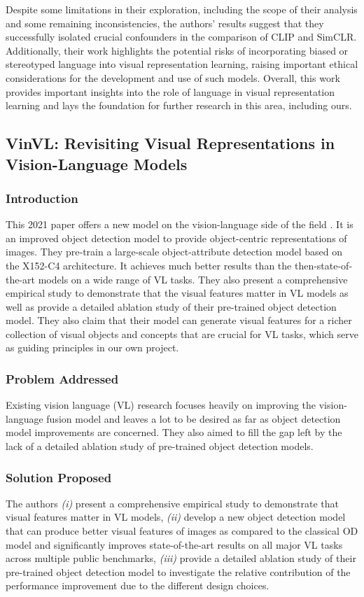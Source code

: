 \documentclass[11pt]{article}
\begin{document}
Despite some limitations in their exploration, including the scope of their analysis and some remaining inconsistencies, the authors' results suggest that they successfully isolated crucial confounders in the comparison of CLIP and SimCLR. Additionally, their work highlights the potential risks of incorporating biased or stereotyped language into visual representation learning, raising important ethical considerations for the development and use of such models. Overall, this work provides important insights into the role of language in visual representation learning and lays the foundation for further research in this area, including ours.

\subsection{VinVL: Revisiting Visual Representations in Vision-Language Models}

\subsubsection{Introduction}
This 2021 paper offers a new model on the vision-language side of the field \citep{zhang2021vinvl}. It is an improved object detection model to provide object-centric representations of images. They pre-train a large-scale object-attribute detection model based on the X152-C4 architecture. It achieves much better results than the then-state-of-the-art models on a wide range of VL tasks. They also present a comprehensive empirical study to demonstrate that the visual features matter in VL models as well as provide a detailed ablation study of their pre-trained object detection model. They also claim that their model can generate visual features for a richer collection of visual objects and concepts that are crucial for VL tasks, which serve as guiding principles in our own project.

\subsubsection{Problem Addressed}
Existing vision language (VL) research focuses heavily on improving the vision-language fusion model and leaves a lot to be desired as far as object detection model improvements are concerned. They also aimed to fill the gap left by the lack of a detailed ablation study of pre-trained object detection models.

\subsubsection{Solution Proposed}
The authors \textit{(i)} present a comprehensive empirical study to demonstrate that visual features matter in VL models, \textit{(ii)} develop a new object detection model that can produce better visual features of images as compared to the classical OD model \cite{anderson2018bottomup} and significantly improves state-of-the-art results on all major VL tasks across multiple public benchmarks, \textit{(iii)} provide a detailed ablation study of their pre-trained object detection model to investigate the relative contribution of the performance improvement due to the different design choices. 
\end{document}

